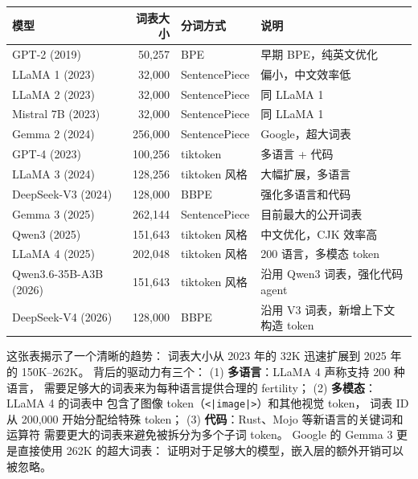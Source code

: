 \begin{center}\small
\renewcommand{\arraystretch}{1.3}
\begin{tabular}{lrll}
\toprule
\rowcolor{figLightGray}
\textbf{模型} & \textbf{词表大小} & \textbf{分词方式} & \textbf{说明} \\
\midrule
GPT-2 (2019)       & 50,257   & BPE          & 早期 BPE，纯英文优化 \\
LLaMA 1 (2023)     & 32,000   & SentencePiece & 偏小，中文效率低 \\
LLaMA 2 (2023)     & 32,000   & SentencePiece & 同 LLaMA 1 \\
Mistral 7B (2023)  & 32,000   & SentencePiece & 同 LLaMA 1 \\
Gemma 2 (2024)     & 256,000  & SentencePiece & Google，超大词表 \\
GPT-4 (2023)       & 100,256  & tiktoken      & 多语言 + 代码 \\
LLaMA 3 (2024)     & 128,256  & tiktoken 风格 & 大幅扩展，多语言 \\
DeepSeek-V3 (2024) & 128,000  & BBPE          & 强化多语言和代码 \\
Gemma 3 (2025)     & 262,144  & SentencePiece & 目前最大的公开词表 \\
Qwen3 (2025)       & 151,643  & tiktoken 风格 & 中文优化，CJK 效率高 \\
LLaMA 4 (2025)     & 202,048  & tiktoken 风格 & 200 语言，多模态 token \\
Qwen3.6-35B-A3B (2026) & 151,643 & tiktoken 风格 & 沿用 Qwen3 词表，强化代码 agent \\
DeepSeek-V4 (2026) & 128,000  & BBPE          & 沿用 V3 词表，新增上下文构造 token \\
\bottomrule
\end{tabular}
\end{center}

\begin{whybox}[从 32K 到 262K：词表大小演进的逻辑]
这张表揭示了一个清晰的趋势：
词表大小从 2023 年的 32K 迅速扩展到 2025 年的 150K--262K。
背后的驱动力有三个：
(1) \textbf{多语言}：LLaMA 4 声称支持 200 种语言，
需要足够大的词表来为每种语言提供合理的 fertility；
(2) \textbf{多模态}：LLaMA 4 的词表中
包含了图像 token（\texttt{<|image|>}）和其他视觉 token，
词表 ID 从 200,000 开始分配给特殊 token；
(3) \textbf{代码}：Rust、Mojo 等新语言的关键词和运算符
需要更大的词表来避免被拆分为多个子词 token。
Google 的 Gemma 3 更是直接使用 262K 的超大词表：
证明对于足够大的模型，嵌入层的额外开销可以被忽略。
\end{whybox}


